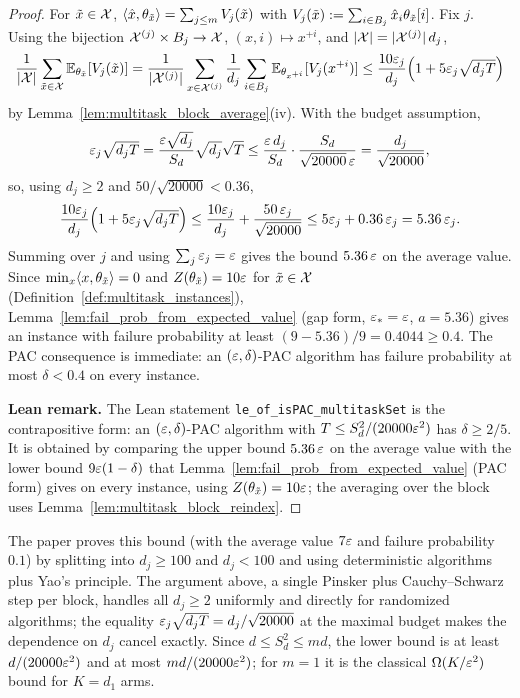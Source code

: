 \begin{proof}
\leanok
{}
For $\tilde x \in \mathcal{X}$, $\langle \hat{x}, \theta_{\tilde x} \rangle = \sum_{j\le m}V_j(\tilde x)$ with
$V_j(\tilde x) := \sum_{i\in B_j}\hat{x}_i\theta_{\tilde x}[i]$. Fix $j$. Using the bijection
$\mathcal{X}^{(j)}\times B_j \to \mathcal{X}$, $(x,i)\mapsto x^{+i}$, and $\lvert \mathcal{X} \rvert = \lvert \mathcal{X}^{(j)} \rvert\,d_j$,
\[
  \frac{1}{\lvert \mathcal{X} \rvert}\sum_{\tilde x\in\mathcal{X}}\mathbb{E}_{\theta_{\tilde x}}[V_j(\tilde x)]
  = \frac{1}{\lvert \mathcal{X}^{(j)} \rvert}\sum_{x\in\mathcal{X}^{(j)}}\frac{1}{d_j}\sum_{i\in B_j}\mathbb{E}_{\theta_{x^{+i}}}[V_j(x^{+i})]
  \le \frac{10\varepsilon_j}{d_j}\Big(1 + 5\varepsilon_j\sqrt{d_jT}\Big)
\]
by Lemma~\ref{lem:multitask_block_average}(iv). With the budget assumption,
\[
  \varepsilon_j\sqrt{d_jT} = \frac{\varepsilon\sqrt{d_j}}{S_d}\sqrt{d_j}\sqrt T
  \le \frac{\varepsilon\,d_j}{S_d}\cdot\frac{S_d}{\sqrt{20000}\,\varepsilon} = \frac{d_j}{\sqrt{20000}},
\]
so, using $d_j \ge 2$ and $50/\sqrt{20000} < 0.36$,
\[
  \frac{10\varepsilon_j}{d_j}\Big(1 + 5\varepsilon_j\sqrt{d_jT}\Big) \le \frac{10\varepsilon_j}{d_j} + \frac{50\,\varepsilon_j}{\sqrt{20000}}
  \le 5\varepsilon_j + 0.36\,\varepsilon_j = 5.36\,\varepsilon_j .
\]
Summing over $j$ and using $\sum_j\varepsilon_j = \varepsilon$ gives the bound $5.36\,\varepsilon$ on the
average value. Since $\min_x\langle x, \theta_{\tilde x} \rangle = 0$ and $Z(\theta_{\tilde x}) = 10\varepsilon$
for $\tilde x \in \mathcal{X}$ (Definition~\ref{def:multitask_instances}),
Lemma~\ref{lem:fail_prob_from_expected_value} (gap form, $\varepsilon_* = \varepsilon$, $a = 5.36$) gives
an instance with failure probability at least $(9 - 5.36)/9 = 0.4044 \ge 0.4$. The PAC
consequence is immediate: an $(\varepsilon,\delta)$-PAC algorithm has failure probability at most
$\delta < 0.4$ on every instance.

\textbf{Lean remark.} The Lean statement \texttt{le\_of\_isPAC\_multitaskSet} is the
contrapositive form: an $(\varepsilon,\delta)$-PAC algorithm with $T \le S_d^2/(20000\varepsilon^2)$ has
$\delta \ge 2/5$. It is obtained by comparing the upper bound $5.36\,\varepsilon$ on the average value
with the lower bound $9\varepsilon(1-\delta)$ that Lemma~\ref{lem:fail_prob_from_expected_value}
(PAC form) gives on every instance, using $Z(\theta_{\tilde x}) = 10\varepsilon$; the averaging over
the block uses Lemma~\ref{lem:multitask_block_reindex}.
\end{proof}

\begin{remark}
The paper proves this bound (with the average value $7\varepsilon$ and failure probability $0.1$)
by splitting into $d_j \ge 100$ and $d_j < 100$ and using deterministic algorithms plus Yao's
principle. The argument above, a single Pinsker plus Cauchy--Schwarz step per block, handles
all $d_j \ge 2$ uniformly and directly for randomized algorithms; the equality
$\varepsilon_j\sqrt{d_jT} = d_j/\sqrt{20000}$ at the maximal budget makes the dependence on $d_j$
cancel exactly. Since $d \le S_d^2 \le md$, the lower bound is at least $d/(20000\varepsilon^2)$
and at most $md/(20000\varepsilon^2)$; for $m = 1$ it is the classical $\Omega(K/\varepsilon^2)$ bound for
$K = d_1$ arms.
\end{remark}

